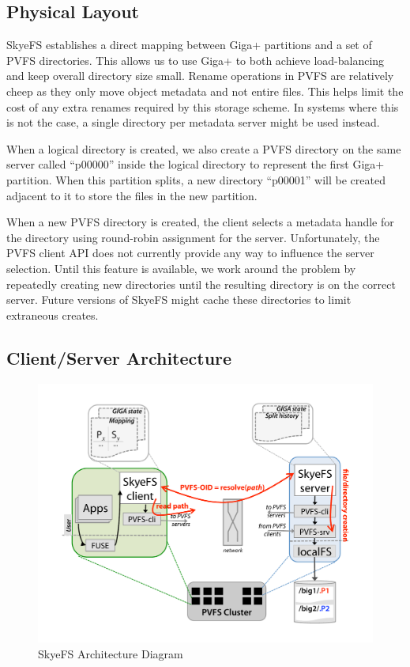 \documentclass[twocolumn,letterpaper]{article}
\begin{document}
\subsection{Physical Layout}
SkyeFS establishes a direct mapping between Giga+ partitions and a set of PVFS
directories.  This allows us to use Giga+ to both achieve load-balancing and
keep overall directory size small.  Rename operations in PVFS are relatively
cheep as they only move object metadata and not entire files.  This helps limit
the cost of any extra renames required by this storage scheme.  In systems
where this is not the case, a single directory per metadata server might be
used instead.

When a logical directory is created, we also create a PVFS directory on the
same server called ``p00000'' inside the logical directory to represent the
first Giga+ partition.  When this partition splits, a new directory ``p00001''
will be created adjacent to it to store the files in the new partition.  

When a new PVFS directory is created, the client selects a metadata handle
for the directory using round-robin assignment for the server.  Unfortunately,
the PVFS client API does not currently provide any way to influence the
server selection.  Until this feature is available, we work around the problem
by repeatedly creating new directories until the resulting directory is on the
correct server.  Future versions of SkyeFS might cache these directories to
limit extraneous creates.

\subsection{Client/Server Architecture}
\begin{figure}
\begin{center}
\includegraphics[scale=0.4]{figure-architecture}
\end{center}
\caption{SkyeFS Architecture Diagram}
\end{figure}
\end{document}
